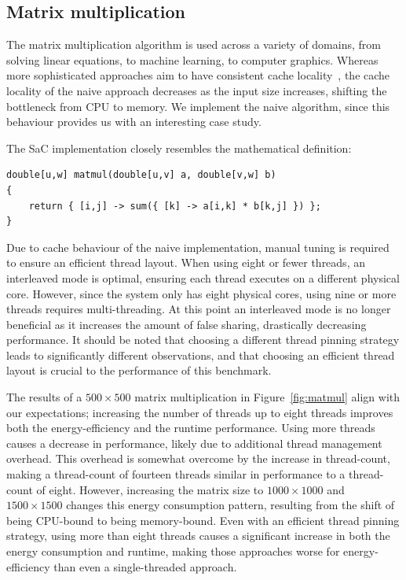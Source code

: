 \documentclass[runningheads]{llncs}
\begin{document}
\subsection{Matrix multiplication}
The matrix multiplication algorithm is used across a variety of domains, from solving linear equations, to machine learning, to computer graphics.
Whereas more sophisticated approaches aim to have consistent cache locality~\cite{sinkarovs2023rank}, the cache locality of the naive approach decreases as the input size increases, shifting the bottleneck from CPU to memory.
We implement the naive algorithm, since this behaviour provides us with an interesting case study.

The SaC implementation closely resembles the mathematical definition:
\begin{verbatim}
double[u,w] matmul(double[u,v] a, double[v,w] b)
{
    return { [i,j] -> sum({ [k] -> a[i,k] * b[k,j] }) };
}
\end{verbatim}

Due to cache behaviour of the naive implementation, manual tuning is required to ensure an efficient thread layout.
When using eight or fewer threads, an interleaved mode is optimal, ensuring each thread executes on a different physical core.
However, since the system only has eight physical cores, using nine or more threads requires multi-threading.
At this point an interleaved mode is no longer beneficial as it increases the amount of false sharing, drastically decreasing performance.
It should be noted that choosing a different thread pinning strategy leads to significantly different observations, and that choosing an efficient thread layout is crucial to the performance of this benchmark.

The results of a $500 \times 500$ matrix multiplication in Figure~\ref{fig:matmul} align with our expectations; increasing the number of threads up to eight threads improves both the energy-efficiency and the runtime performance.
Using more threads causes a decrease in performance, likely due to additional thread management overhead.
This overhead is somewhat overcome by the increase in thread-count, making a thread-count of fourteen threads similar in performance to a thread-count of eight.
However, increasing the matrix size to $1000 \times 1000$ and $1500 \times 1500$ changes this energy consumption pattern, resulting from the shift of being CPU-bound to being memory-bound.
Even with an efficient thread pinning strategy, using more than eight threads causes a significant increase in both the energy consumption and runtime, making those approaches worse for energy-efficiency than even a single-threaded approach.
\end{document}
